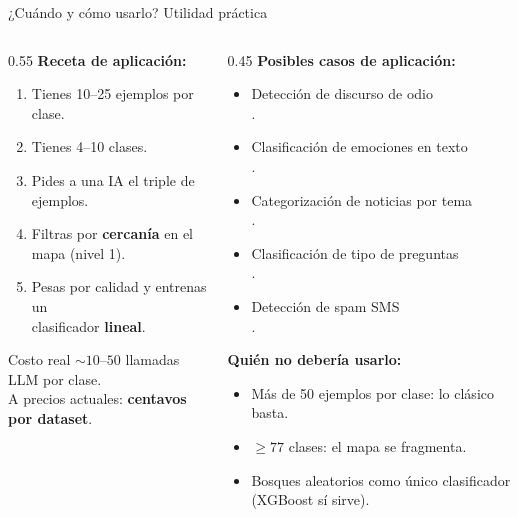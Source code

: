 \begin{frame}{¿Cuándo y cómo usarlo? Utilidad práctica}
\small
\begin{columns}[T]

\begin{column}{0.55\textwidth}
\textbf{Receta de aplicación:}
\begin{enumerate}\setlength\itemsep{1pt}
  \item Tienes \alert{10--25 ejemplos por clase}.
  \item Tienes \alert{4--10 clases}.
  \item Pides a una IA el triple de ejemplos.
  \item Filtras por \textbf{cercanía} en el mapa (nivel 1).
  \item Pesas por calidad y entrenas un\\
        clasificador \textbf{lineal}.
\end{enumerate}

\vspace{0.4em}
\begin{block}{Costo real}
$\sim 10$--$50$ llamadas LLM por clase.\\
A precios actuales: \textbf{centavos por dataset}.
\end{block}
\end{column}

\begin{column}{0.45\textwidth}
\textbf{Posibles casos de aplicación:}
\scriptsize
\begin{itemize}\setlength\itemsep{1pt}
  \item Detección de discurso de odio\\.
  \item Clasificación de emociones en texto\\.
  \item Categorización de noticias por tema\\.
  \item Clasificación de tipo de preguntas\\.
  \item Detección de spam SMS\\.
\end{itemize}

\vspace{0.4em}
\small
\textbf{Quién no debería usarlo:}
\scriptsize
\begin{itemize}\setlength\itemsep{1pt}
  \item Más de 50 ejemplos por clase: lo clásico basta.
  \item $\geq 77$ clases: el mapa se fragmenta.
  \item Bosques aleatorios como único clasificador (XGBoost sí sirve).
\end{itemize}
\end{column}

\end{columns}
\end{frame}

